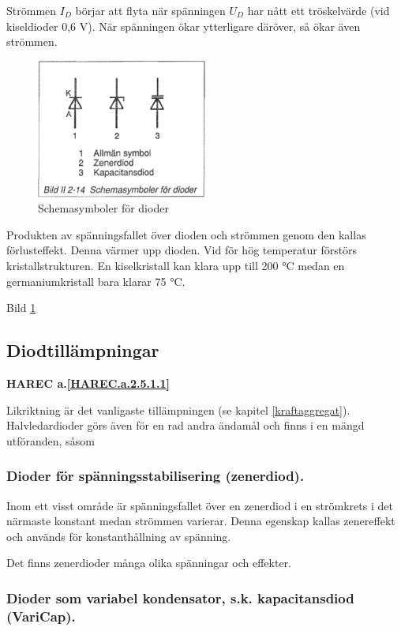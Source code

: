 Strömmen \(I_D\) börjar att flyta när spänningen \(U_D\) har nått ett
tröskelvärde (vid kiseldioder 0,6 V). När spänningen ökar ytterligare däröver,
så ökar även strömmen.

\begin{figure}
\includegraphics[width=0.5\textwidth]{images/bild_2_2-14}
\caption{Schemasymboler för dioder}
\label{fig:BildII2-14}
\end{figure}

Produkten av spänningsfallet över dioden och strömmen genom den kallas
förlusteffekt. Denna värmer upp dioden. Vid för hög temperatur förstörs
kristallstrukturen. En kiselkristall kan klara upp till 200 °C medan en
germaniumkristall bara klarar 75 °C.

Bild \ref{fig:BildII2-14}

\subsection{Diodtillämpningar}
\textbf{HAREC a.\ref{HAREC.a.2.5.1.1}\label{myHAREC.a.2.5.1.1}}

Likriktning är det vanligaste tillämpningen (se kapitel \ref{kraftaggregat}).
Halvledardioder görs även för en rad andra ändamål och finns i en mängd
utföranden, såsom

\subsubsection{Dioder för spänningsstabilisering (zenerdiod).}

  Inom ett visst område är spänningsfallet över en zenerdiod i en strömkrets
  i det närmaste konstant medan strömmen varierar. Denna egenskap kallas
  zenereffekt och används för konstanthållning av spänning.

  Det finns zenerdioder många olika spänningar och effekter.

\subsubsection{Dioder som variabel kondensator, s.k. kapacitansdiod (VariCap).}
\label{varicap}

